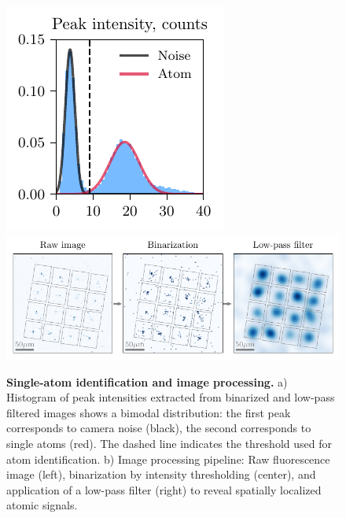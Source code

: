 \begin{figure}
    \centering
    \includegraphics{fig-py/imaging-hist.pdf}
    \hfill
    \includegraphics{fig-py/imaging-base.pdf}
    \caption{
        \textbf{Single-atom identification and image processing.}
        a) Histogram of peak intensities extracted from binarized and low-pass filtered images shows a bimodal distribution: the first peak corresponds to camera noise (black), the second corresponds to single atoms (red). The dashed line indicates the threshold used for atom identification.
        b) Image processing pipeline: Raw fluorescence image (left), binarization by intensity thresholding (center), and application of a low-pass filter (right) to reveal spatially localized atomic signals. 
    }
    \label{fig:imaging-base}
\end{figure}
